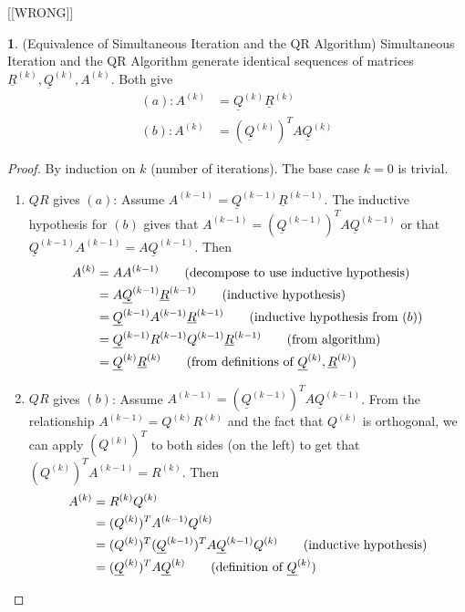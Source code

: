 \documentclass[12pt]{article}
\theoremstyle{definition}
\newtheorem{theorem}{\color{ForestGreen}{\textbf{Theorem}}}
\theoremstyle{definition}
\begin{document}
[[WRONG]]
\begin{theorem}(Equivalence of Simultaneous Iteration and the QR Algorithm)
Simultaneous Iteration and the QR Algorithm generate identical sequences of matrices $\underline R^{(k)}, \underline Q^{(k)}, A^{(k)}$. Both give
\begin{align}
	(a): A^{(k)} &= \underline Q^{(k)} \underline R^{(k)} \tag{$QR$ factorization of the $k$th power of $A$}\\
	(b): A^{(k)} &= (\underline Q^{(k)})^T A \underline Q^{(k)} \tag{projection}
\end{align}
\end{theorem}
\begin{proof}
By induction on $k$ (number of iterations). The base case $k=0$ is trivial. 
\begin{enumerate}
	\item $QR$ gives $(a)$: Assume $A^{(k-1)} = \underline Q^{(k-1)} \underline R^{(k-1)}$. The inductive hypothesis for $(b)$ gives that $A^{(k-1)} = (\underline Q^{(k-1)})^T A \underline Q^{(k-1)}$ or that $ \underline Q^{(k-1)} A^{(k-1)} = A \underline Q^{(k-1)}$. Then
	\begin{align*}
		A^{(k)} &= A A^{(k-1)} \tag{decompose to use inductive hypothesis}\\
		&= A \underline Q^{(k-1)} \underline R^{(k-1)} \tag{inductive hypothesis}\\
		&= \underline Q^{(k-1)} A^{(k-1)} \underline R^{(k-1)} \tag{inductive hypothesis from $(b)$}\\
		&= \underline Q^{(k-1)} R^{(k-1)}Q^{(k-1)} \underline R^{(k-1)} \tag{from algorithm} \\
		&= \underline Q^{(k)} \underline R^{(k)} \tag{from definitions of $\underline Q^{(k)}, \underline R^{(k)}$}
	\end{align*}
	\item $QR$ gives $(b)$: Assume $A^{(k-1)} = (\underline Q^{(k-1)})^T A \underline Q^{(k-1)}$. From the relationship $A^{(k-1)} = Q^{(k)}R^{(k)}$ and the fact that $Q^{(k)}$ is orthogonal, we can apply $(Q^{(k)})^T$ to both sides (on the left) to get that $(Q^{(k)})^T A^{(k-1)} = R^{(k)}$. Then
	\begin{align*}
		A^{(k)} &= R^{(k)}Q^{(k)} \\
		&= (Q^{(k)})^T A^{(k-1)} Q^{(k)} \\
		&= (Q^{(k)})^T (\underline Q^{(k-1)})^T A \underline Q^{(k-1)} Q^{(k)} \tag{inductive hypothesis} \\
		&= (\underline Q^{(k)})^T A \underline Q^{(k)} \tag{definition of $\underline Q^{(k)}$}
	\end{align*}
\end{enumerate}
\end{proof}
\end{document}
